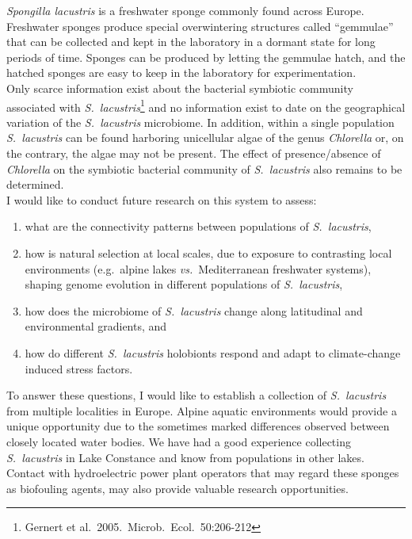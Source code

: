 \documentclass[a4paper,11pt]{article}
\begin{document}
\emph{Spongilla lacustris} is a freshwater sponge commonly found across Europe. Freshwater sponges produce special overwintering structures called ``gemmulae'' that can be collected and kept in the laboratory in a dormant state for long periods of time. Sponges can be produced by letting the gemmulae hatch, and the hatched sponges are easy to keep in the laboratory for experimentation.\\

Only scarce information exist about the bacterial symbiotic community associated with \emph{S.~lacustris}\footnote{Gernert et al.~2005.~Microb.~Ecol.~50:206-212} and no information exist to date on the geographical variation of the \emph{S.~lacustris} microbiome. In addition, within a single population \emph{S.~lacustris} can be found harboring unicellular algae of the genus \emph{Chlorella} or, on the contrary, the algae may not be present. The effect of presence/absence of \emph{Chlorella} on the symbiotic bacterial community of \emph{S.~lacustris} also remains to be determined. \\

I would like to conduct future research on this system to assess:
\begin{enumerate}
\item what are the connectivity patterns between populations of \emph{S.~lacustris},
\item how is natural selection at local scales, due to exposure to contrasting local environments (e.g.~alpine lakes \emph{vs.}~Mediterranean freshwater systems), shaping genome evolution in different populations of \emph{S.~lacustris},
\item how does the microbiome of \emph{S.~lacustris} change along latitudinal and environmental gradients, and
\item how do different \emph{S.~lacustris} holobionts respond and adapt to climate-change induced stress factors.
\end{enumerate}

To answer these questions, I would like to establish a collection of \emph{S.~lacustris} from multiple localities in Europe. Alpine aquatic environments would provide a unique opportunity due to the sometimes marked differences observed between closely located water bodies. We have had a good experience collecting \emph{S.~lacustris} in Lake Constance and know from populations in other lakes. Contact with hydroelectric power plant operators that may regard these sponges as biofouling agents, may also provide valuable research opportunities. \\
\end{document}
